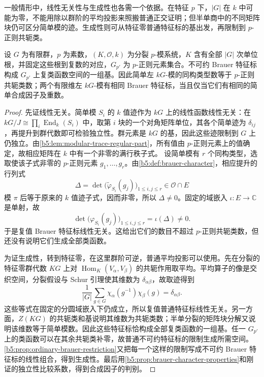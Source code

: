 一般情形中，线性无关性与生成性也各需一个依据。在特征 \(p\) 下，\(|G|\) 在 \(k\) 中可能为零，不能用除以群阶的平均投影来照搬普通正交证明；但半单商中的不同矩阵块仍可区分简单模的迹。生成性则可从特征零普通特征标的基出发，再限制到 \(p\)-正则共轭类。
\begin{theorem}\label{b5:thm:brauer-character-basis}
	设 \(G\) 为有限群，\(p\) 为素数，\((K,\mathcal O,k)\) 为分裂 \(p\)-模系统，\(K\) 含有全部 \(|G|\) 次单位根，并固定这些根到复数的对应，\(G_{p'}\) 为 \(p\)-正则元素集合。不可约 Brauer 特征标构成 \(G_{p'}\) 上复类函数空间的一组基。因此简单左 \(kG\)-模的同构类型数等于 \(p\)-正则共轭类数；两个有限维左 \(kG\)-模有相同 Brauer 特征标，当且仅当它们有相同的简单合成因子及重数。
\end{theorem}
\begin{proof}
	先证线性无关。简单模 \(S_i\) 的 \(k\) 值迹作为 \(kG\) 上的线性函数线性无关：在 \(kG/J\cong\prod_i\operatorname{End}_k(S_i)\) 中，取第 \(i\) 块的一个对角矩阵单位，其各个简单迹为 \(\delta_{ij}\)，再提升到群代数即可检验独立性。群元素是 \(kG\) 的基，因此这些迹限制到 \(G\) 上仍独立。由\cref{b5:lem:modular-trace-regular-part}，所有值由 \(p\)-正则元素上的值确定，故相应矩阵在 \(k\) 中有一个非零的满行秩子式。 设简单模有 \(r\) 个同构类型，选取使该子式非零的 \(p\)-正则元素 \(g_1,\ldots,g_r\)。由\cref{b5:def:brauer-character}，相应提升的行列式
	\[
		\Delta=\det\bigl(\widetilde\varphi_{S_i}(g_j)\bigr)_{1\le i,j\le r} \in\mathcal O\cap E
	\]
	模 \(\pi\) 后等于原来的 \(k\) 值迹子式，因而非零，所以 \(\Delta\ne0\)。固定的域嵌入 \(\iota:E\to\mathbb C\) 是单射，故
	\[
		\det\bigl(\varphi_{S_i}(g_j)\bigr)_{1\le i,j\le r} =\iota(\Delta)\ne0.
	\]
	于是复值 Brauer 特征标线性无关。这给出它们的数目不超过 \(p\)-正则共轭类数，但还没有说明它们生成全部类函数。

	为证生成性，转到特征零，在这里群阶可逆，普通平均投影可以使用。先在分裂的特征零群代数 \(KG\) 上对 \(\operatorname{Hom}_K(V_\alpha,V_\beta)\) 的共轭作用取平均。平均算子的像是交织空间，分裂假设与 Schur 引理使其维数为 \(\delta_{\alpha\beta}\)，故取迹得到
	\[
		\frac1{|G|}\sum_{g\in G}\chi_\alpha(g^{-1})\chi_\beta(g) =\delta_{\alpha\beta}.
	\]
	这些等式在固定的分圆域嵌入下仍成立，所以复值普通特征标线性无关。另一方面，\(Z(KG)\) 的共轭类和基说明其维数为共轭类数；半单分裂的矩阵块分解又说明该维数等于简单模数。因此这些特征标恰构成全部复类函数的一组基。任一 \(G_{p'}\) 上的类函数可以在其余共轭类补零，故普通不可约特征标的限制生成所需空间。\cref{b5:prop:ordinary-brauer-restriction}又把每一个这样的限制写成不可约 Brauer 特征标的线性组合，得到生成性。最后用\cref{b5:prop:brauer-character-properties}和刚证的独立性比较系数，得到合成因子的判别。
\end{proof}
